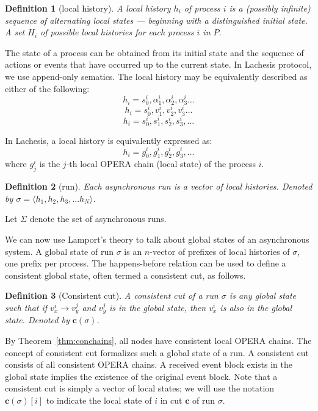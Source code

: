 \documentclass{article}
\newtheorem{defn}{Definition}[section]
\renewcommand{\vec}[1]{\mathbf{#1}}
\begin{document}
\begin{defn}[local history] A local history $h_i$ of process $i$ is a (possibly infinite) sequence of alternating local states  --- beginning with a distinguished initial state. A set $H_i$ of possible local histories for each process $i$ in $P$.
\end{defn}


The state of a process can be obtained from its initial state and the sequence of actions or events that have occurred up to the current state. 
In Lachesis protocol, we use append-only sematics. The local history may be equivalently described as either of the following:
$$h_i = s_0^i,\alpha_1^i,\alpha_2^i, \alpha_3^i \dots $$
$$h_i = s_0^i, v_1^i,v_2^i, v_3^i \dots $$
$$h_i = s_0^i, s_1^i, s_2^i, s_3^i, \dots$$

In Lachesis, a local history is equivalently expressed as:
$$h_i = g_0^i, g_1^i, g_2^i, g_3^i, \dots$$
where $g_j^i$ is the $j$-th local OPERA chain (local state) of the process $i$.

\begin{defn}[run] Each asynchronous run is a vector of local histories. Denoted by
	$\sigma = \langle h_1,h_2,h_3,...h_N \rangle$.
\end{defn}

Let $\Sigma$ denote the set of asynchronous runs.

We can now use Lamport’s theory to talk about global states of an asynchronous system.
A global state of run $\sigma$ is an $n$-vector of prefixes of local histories of $\sigma$, one prefix per process.
The happens-before relation can be used to define a consistent global state, often termed a consistent cut, as follows.

\begin{defn}[Consistent cut] A consistent cut of a run $\sigma$ is any global state such that if $v_x^i \rightarrow v_y^j$ and $v_y^j$ is in the global state, then $v_x^i$ is also in the global state. Denoted by $\vec{c}(\sigma)$.
\end{defn}


By Theorem~\ref{thm:conchains}, all nodes have consistent local OPERA chains. The concept of consistent cut formalizes such a global state of a run. A consistent cut consists of all consistent OPERA chains. A received event block exists in the global state implies the existence of the original event block.
Note that a consistent cut is simply a vector of local states; we will use the notation $\vec{c}(\sigma)[i]$ to indicate the local state of $i$ in cut $\vec{c}$ of run $\sigma$.
\end{document}

